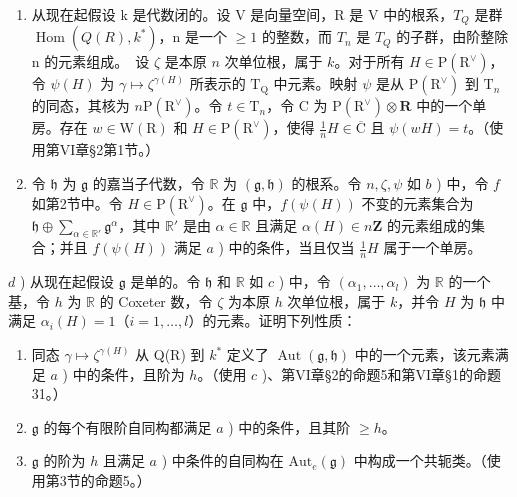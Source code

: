 \begin{enumerate}
\def\labelenumi{\alph{enumi})}
\setcounter{enumi}{1}
\item
  从现在起假设 k 是代数闭的。设 V 是向量空间，R 是 V 中的根系，\(T_{Q}\) 是群 \(\operatorname{Hom}(Q(R), k^{*})\)，n 是一个 \(\geq 1\) 的整数，而 \(T_{n}\) 是 \(T_{Q}\) 的子群，由阶整除 n 的元素组成。~设 \(\zeta\) 是本原 \(n\) 次单位根，属于 \(k\)。对于所有 \(H \in \mathrm{P}(\mathrm{R}^{\vee})\)，令 \(\psi(H)\) 为 \(\gamma \mapsto \zeta^{\gamma(H)}\) 所表示的 \(\mathrm{T}_{\mathrm{Q}}\) 中元素。映射 \(\psi\) 是从 \(\mathrm{P}(\mathrm{R}^{\vee})\) 到 \(\mathrm{T}_n\) 的同态，其核为 \(n\mathrm{P}(\mathrm{R}^{\vee})\)。令 \(t \in \mathrm{T}_n\)，令 \(\mathrm{C}\) 为 \(\mathrm{P}(\mathrm{R}^{\vee}) \otimes \mathbf{R}\) 中的一个单房。存在 \(w \in \mathrm{W}(\mathrm{R})\) 和 \(H \in \mathrm{P}(\mathrm{R}^{\vee})\)，使得 \(\frac{1}{n} H \in \overline{\mathrm{C}}\) 且 \(\psi(wH) = t\)。（使用第VI章§2第1节。）
\item
  令 \(\mathfrak{h}\) 为 \(\mathfrak{g}\) 的嘉当子代数，令 \(\mathbb{R}\) 为 \((\mathfrak{g},\mathfrak{h})\) 的根系。令 \(n,\zeta ,\psi\) 如 \(b\) ) 中，令 \(f\) 如第2节中。令 \(H\in \mathrm{P}(\mathrm{R}^{\vee})\)。在 \(\mathfrak{g}\) 中，\(f(\psi (H))\) 不变的元素集合为 \(\mathfrak{h}\oplus \sum_{\alpha \in \mathbb{R}'}\mathfrak{g}^\alpha\)，其中 \(\mathbb{R}'\) 是由 \(\alpha \in \mathbb{R}\) 且满足 \(\alpha (H)\in n\mathbf{Z}\) 的元素组成的集合；并且 \(f(\psi (H))\) 满足 \(a\) ) 中的条件，当且仅当 \(\frac{1}{n} H\) 属于一个单房。
\end{enumerate}

\(d\) ) 从现在起假设 \(\mathfrak{g}\) 是单的。令 \(\mathfrak{h}\) 和 \(\mathbb{R}\) 如 \(c\) ) 中，令 \((\alpha_{1},\ldots ,\alpha_{l})\) 为 \(\mathbb{R}\) 的一个基，令 \(h\) 为 \(\mathbb{R}\) 的 Coxeter 数，令 \(\zeta\) 为本原 \(h\) 次单位根，属于 \(k\)，并令 \(H\) 为 \(\mathfrak{h}\) 中满足 \(\alpha_{i}(H) = 1\)（\(i = 1,\dots,l\)）的元素。证明下列性质：

\begin{enumerate}
\def\labelenumi{(\roman{enumi})}
\item
  同态 \(\gamma \mapsto \zeta^{\gamma (H)}\) 从 Q(R) 到 \(k^{*}\) 定义了 \(\operatorname {Aut}(\mathfrak{g},\mathfrak{h})\) 中的一个元素，该元素满足 \(a\) ) 中的条件，且阶为 \(h\)。（使用 \(c\) )、第VI章§2的命题5和第VI章§1的命题31。）
\item
  \(\mathfrak{g}\) 的每个有限阶自同构都满足 \(a\) ) 中的条件，且其阶 \(\geq h\)。
\item
  \(\mathfrak{g}\) 的阶为 \(h\) 且满足 \(a\) ) 中条件的自同构在 \(\mathrm{Aut}_e(\mathfrak{g})\) 中构成一个共轭类。（使用第3节的命题5。）
\end{enumerate}

